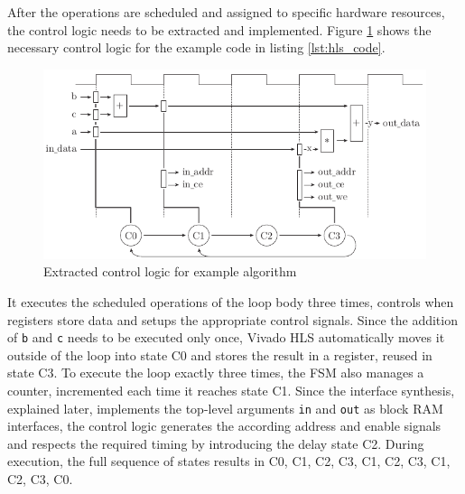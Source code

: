 After the operations are scheduled and assigned to specific hardware
resources, the control logic needs to be extracted and implemented. Figure
\ref{fig:hls_c} shows the necessary control logic for the example code in
listing \ref{lst:hls_code}.
\begin{figure}[tb]
	\centering
	\includegraphics{../figures/hls_c}
	\caption{Extracted control logic for example algorithm}
	\label{fig:hls_c}
\end{figure}
It executes the scheduled operations of the loop body three times, controls
when registers store data and setups the appropriate control signals. Since
the addition of \lstinline{b} and \lstinline{c} needs to be executed only
once, Vivado \ac{HLS} automatically moves it outside of the loop into state C0
and stores the result in a register, reused in state C3. To execute the loop
exactly three times, the \ac{FSM} also manages a counter, incremented each
time it reaches state C1. Since the interface synthesis, explained later,
implements the top-level arguments \lstinline{in} and \lstinline{out} as block
\ac{RAM} interfaces, the control logic generates the according address and
enable signals and respects the required timing by introducing the delay state
C2. During execution, the full sequence of states results in C0, C1, C2, C3, C1, C2, C3, C1, C2, C3, C0.



